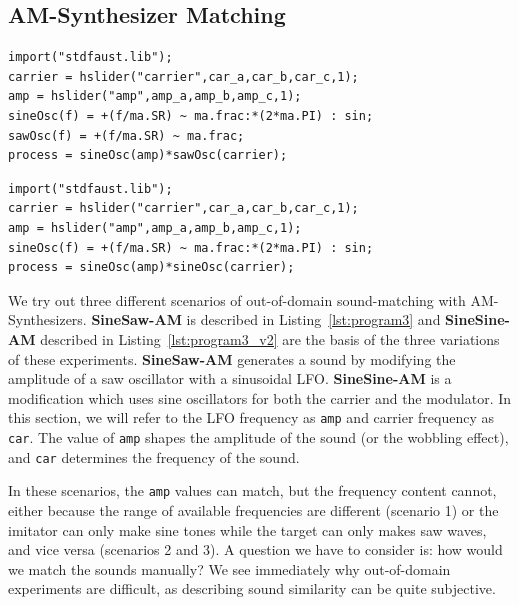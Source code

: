 \documentclass{article} %
\newcommand{\FMMod}{\textbf{SineSaw-AM}\xspace}
\newcommand{\FMModvtwo}{\textbf{SineSine-AM}\xspace}
\begin{document}
\subsection{AM-Synthesizer Matching}
\begin{lstlisting}[caption={\FMMod}, label={lst:program3},language=Faust,float,floatplacement=!H,xleftmargin=1em,xrightmargin=0.5em,firstnumber=0,aboveskip=0em, belowskip=-1em]
import("stdfaust.lib");
carrier = hslider("carrier",car_a,car_b,car_c,1);
amp = hslider("amp",amp_a,amp_b,amp_c,1);
sineOsc(f) = +(f/ma.SR) ~ ma.frac:*(2*ma.PI) : sin;
sawOsc(f) = +(f/ma.SR) ~ ma.frac;
process = sineOsc(amp)*sawOsc(carrier);
\end{lstlisting}


\begin{lstlisting}[caption={\FMModvtwo}, label={lst:program3_v2},language=Faust,float,floatplacement=!H,xleftmargin=1em,xrightmargin=0.5em,firstnumber=0,aboveskip=0em, belowskip=-1em]
import("stdfaust.lib");
carrier = hslider("carrier",car_a,car_b,car_c,1);
amp = hslider("amp",amp_a,amp_b,amp_c,1);
sineOsc(f) = +(f/ma.SR) ~ ma.frac:*(2*ma.PI) : sin;
process = sineOsc(amp)*sineOsc(carrier);
\end{lstlisting}
\label{sec:am_sound_matching}
We try out three different scenarios of out-of-domain sound-matching with AM-Synthesizers. \FMMod is described in Listing~\ref{lst:program3} and \FMModvtwo described in Listing~\ref{lst:program3_v2} are the basis of the three variations of these experiments. \FMMod generates a sound by modifying the amplitude of a saw oscillator with a sinusoidal LFO. \FMModvtwo is a modification which uses sine oscillators for both the carrier and the modulator. In this section, we will refer to the LFO frequency as \texttt{amp} and carrier frequency as \texttt{car}. The value of \texttt{amp} shapes the amplitude of the sound (or the wobbling effect), and \texttt{car} determines the frequency of the sound.

In these scenarios, the \texttt{amp} values can match, but the frequency content cannot, either because the range of available frequencies are different (scenario 1) or the imitator can only make sine tones while the target can only makes saw waves, and vice versa (scenarios 2 and 3). A question we have to consider is: how would we match the sounds manually? We see immediately why out-of-domain experiments are difficult, as describing sound similarity can be quite subjective.
\end{document}
